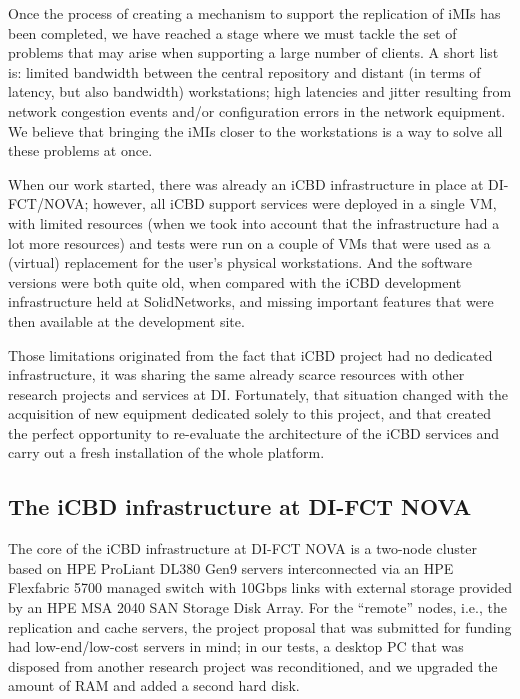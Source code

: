 Once the process of creating a mechanism to support the replication of iMIs has been completed, we have reached a stage where we must tackle the set of problems that may arise when supporting a large number of clients. A short list is: limited bandwidth between the central repository and distant (in terms of latency, but also bandwidth) workstations; high latencies and jitter resulting from network congestion events and/or configuration errors in the network equipment.
We believe that bringing the iMIs closer to the workstations is a way to solve all these problems at once.

When our work started, there was already an iCBD infrastructure in place at DI-FCT/NOVA; however, all iCBD support services were deployed in a single VM, with limited resources (when we took into account that the infrastructure had a lot more resources) and tests were run on a couple of VMs that were used as a (virtual) replacement for the user’s physical workstations. And the software versions were both quite old, when compared with the iCBD development infrastructure held at SolidNetworks, and missing important features that were then available at the development site.

Those limitations originated from the fact that iCBD project had no dedicated infrastructure, it was sharing the same already scarce resources with other research projects and services at DI. Fortunately, that situation changed with the acquisition of new equipment dedicated solely to this project, and that created the perfect opportunity to re-evaluate the architecture of the iCBD services and carry out a fresh installation of the whole platform.


\subsection{The iCBD infrastructure at DI-FCT NOVA}
\label{sub:impl_infrastructure}

The core of the iCBD infrastructure at DI-FCT NOVA is a two-node cluster based on HPE ProLiant DL380 Gen9 servers interconnected via an HPE Flexfabric 5700 managed switch with 10Gbps links with external storage provided by an HPE MSA 2040 SAN Storage Disk Array.
For the “remote” nodes, i.e., the replication and cache servers, the project proposal that was submitted for funding had low-end/low-cost servers in mind; in our tests, a desktop PC that was disposed from another research project was reconditioned, and we upgraded the amount of RAM and added a second hard disk.

